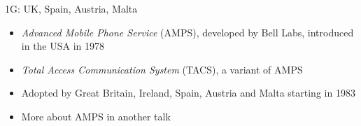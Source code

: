 \begin{frame}{1G: UK, Spain, Austria, Malta}
  \begin{itemize}  
    \item \emph{Advanced Mobile Phone Service} (AMPS), developed by Bell Labs, introduced in the USA in 1978
    \item \emph{Total Access Communication System} (TACS), a variant of AMPS
    \item Adopted by Great Britain, Ireland, Spain, Austria and Malta starting in 1983
    \item More about AMPS in another talk
  \end{itemize}
\end{frame}
